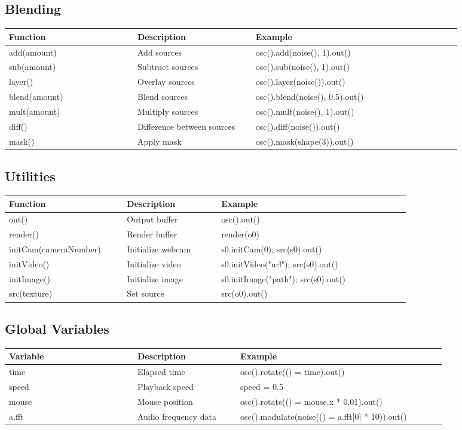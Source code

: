 \documentclass[9pt,oneside]{amsart}
\begin{document}
\subsection*{Blending}
\begin{tabular}{L{0.25\linewidth}L{0.23\linewidth}L{0.40\linewidth}}
\toprule
\textbf{Function} & \textbf{Description} & \textbf{Example} \\
\midrule
add(amount) & Add sources & osc().add(noise(), 1).out() \\
sub(amount) & Subtract sources & osc().sub(noise(), 1).out() \\
layer() & Overlay sources & osc().layer(noise()).out() \\
blend(amount) & Blend sources & osc().blend(noise(), 0.5).out() \\
mult(amount) & Multiply sources & osc().mult(noise(), 1).out() \\
diff() & Difference between sources & osc().diff(noise()).out() \\
mask() & Apply mask & osc().mask(shape(3)).out() \\
\bottomrule
\end{tabular}

\subsection*{Utilities}
\begin{tabular}{L{0.25\linewidth}L{0.20\linewidth}L{0.40\linewidth}}
\toprule
\textbf{Function} & \textbf{Description} & \textbf{Example} \\
\midrule
out() & Output buffer & osc().out() \\
render() & Render buffer & render(o0) \\
initCam(cameraNumber) & Initialize webcam & s0.initCam(0); src(s0).out() \\
initVideo() & Initialize video & s0.initVideo("url"); src(s0).out() \\
initImage() & Initialize image & s0.initImage("path"); src(s0).out() \\
src(texture) & Set source & src(o0).out() \\
\bottomrule
\end{tabular}

\subsection*{Global Variables}
\begin{tabular}{L{0.25\linewidth}L{0.20\linewidth}L{0.40\linewidth}}
\toprule
\textbf{Variable} & \textbf{Description} & \textbf{Example} \\
\midrule
time & Elapsed time & osc().rotate(() =\> time).out() \\
speed & Playback speed & speed = 0.5 \\
mouse & Mouse position & osc().rotate(() =\> mouse.x * 0.01).out() \\
a.fft & Audio frequency data & osc().modulate(noise(() =\> a.fft[0] * 10)).out() \\
\bottomrule
\end{tabular}
\end{document}
